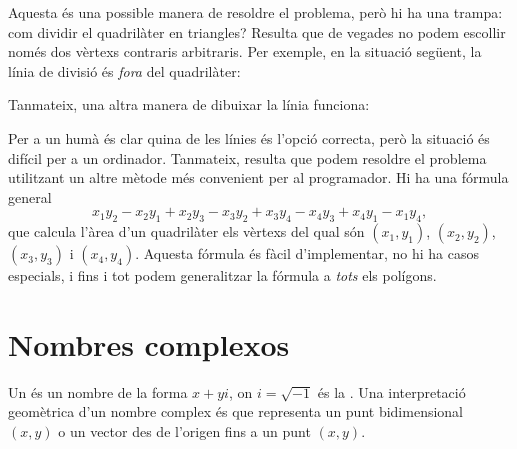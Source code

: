 Aquesta és una possible manera de resoldre el problema, però hi ha una
trampa: com dividir el quadrilàter en triangles? Resulta que de
vegades no podem escollir només dos vèrtexs contraris arbitraris. Per
exemple, en la situació següent, la línia de divisió és \emph{fora}
del quadrilàter:
\begin{center}
\end{center}
Tanmateix, una altra manera de dibuixar la línia funciona:
\begin{center}
\end{center}
Per a un humà és clar quina de les línies és l'opció correcta, però la
situació és difícil per a un ordinador. Tanmateix, resulta que podem
resoldre el problema utilitzant un altre mètode més convenient per al
programador. Hi ha una fórmula general
\[x_1y_2-x_2y_1+x_2y_3-x_3y_2+x_3y_4-x_4y_3+x_4y_1-x_1y_4,\]
que calcula l'àrea d'un quadrilàter els vèrtexs del qual són
$(x_1,y_1)$, $(x_2,y_2)$, $(x_3,y_3)$ i $(x_4,y_4)$. Aquesta fórmula
és fàcil d'implementar, no hi ha casos especials, i fins i tot podem
generalitzar la fórmula a \emph{tots} els polígons.

\section{Nombres complexos}

  

Un  és un nombre de la forma $x+y i$, on $i =
\sqrt{-1}$ és la . Una interpretació geomètrica
d'un nombre complex és que representa un punt bidimensional $(x,y)$ o
un vector des de l'origen fins a un punt $(x,y)$.


